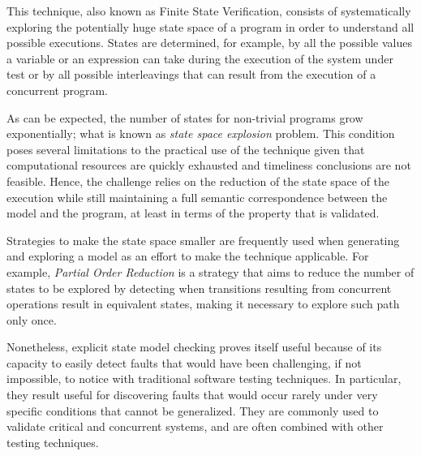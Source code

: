 

\label{subsec:explicit-state-model-checking}

This technique, also known as Finite State Verification, consists of systematically exploring the potentially huge state space of a program in order to understand all possible executions. States are determined, for example, by all the possible values a variable or an expression can take during the execution of the system under test or by all possible interleavings that can result from the execution of a concurrent program. 

As can be expected, the number of states for non-trivial programs grow exponentially; what is known as \textit{state space explosion} problem. This condition poses several limitations to the practical use of the technique given that computational resources are quickly exhausted and timeliness conclusions are not feasible. Hence, the challenge relies on the reduction of the state space of the execution while still maintaining a full semantic correspondence between the model and the program, at least in terms of the property that is validated.

Strategies to make the state space smaller are frequently used when generating and exploring a model as an effort to make the technique applicable. For example, \textit{Partial Order Reduction} is a strategy that aims to reduce the number of states to be explored by detecting when transitions resulting from concurrent operations result in equivalent states, making it necessary to explore such path only once. 

Nonetheless, explicit state model checking proves itself useful because of its capacity to easily detect faults that would have been challenging, if not impossible, to notice with traditional software testing techniques. In particular, they result useful for discovering faults that would occur rarely under very specific conditions that cannot be generalized. They are commonly used to validate critical and concurrent systems, and are often combined with other testing techniques.

